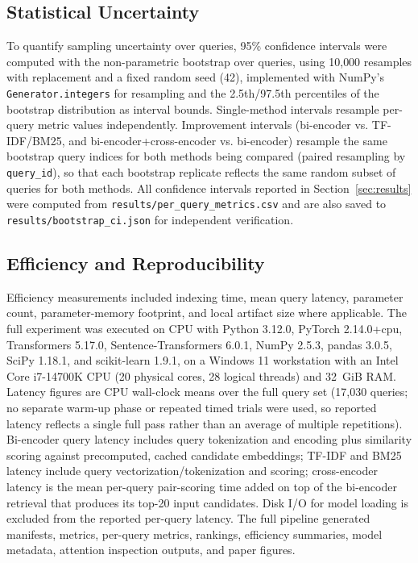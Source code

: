 \documentclass[conference]{IEEEtran}
\begin{document}
\subsection{Statistical Uncertainty}
\label{sec:bootstrap}
To quantify sampling uncertainty over queries, 95\% confidence intervals were computed with the non-parametric bootstrap over queries, using 10{,}000 resamples with replacement and a fixed random seed (42), implemented with NumPy's \texttt{Generator.integers} for resampling and the 2.5th/97.5th percentiles of the bootstrap distribution as interval bounds. Single-method intervals resample per-query metric values independently. Improvement intervals (bi-encoder vs. TF-IDF/BM25, and bi-encoder+cross-encoder vs. bi-encoder) resample the same bootstrap query indices for both methods being compared (paired resampling by \texttt{query\_id}), so that each bootstrap replicate reflects the same random subset of queries for both methods. All confidence intervals reported in Section~\ref{sec:results} were computed from \texttt{results/per\_query\_metrics.csv} and are also saved to \texttt{results/bootstrap\_ci.json} for independent verification.

\subsection{Efficiency and Reproducibility}
Efficiency measurements included indexing time, mean query latency, parameter count, parameter-memory footprint, and local artifact size where applicable. The full experiment was executed on CPU with Python 3.12.0, PyTorch 2.14.0+cpu, Transformers 5.17.0, Sentence-Transformers 6.0.1, NumPy 2.5.3, pandas 3.0.5, SciPy 1.18.1, and scikit-learn 1.9.1, on a Windows 11 workstation with an Intel Core i7-14700K CPU (20 physical cores, 28 logical threads) and 32~GiB RAM. Latency figures are CPU wall-clock means over the full query set (17,030 queries; no separate warm-up phase or repeated timed trials were used, so reported latency reflects a single full pass rather than an average of multiple repetitions). Bi-encoder query latency includes query tokenization and encoding plus similarity scoring against precomputed, cached candidate embeddings; TF-IDF and BM25 latency include query vectorization/tokenization and scoring; cross-encoder latency is the mean per-query pair-scoring time added on top of the bi-encoder retrieval that produces its top-20 input candidates. Disk I/O for model loading is excluded from the reported per-query latency. The full pipeline generated manifests, metrics, per-query metrics, rankings, efficiency summaries, model metadata, attention inspection outputs, and paper figures.
\end{document}
